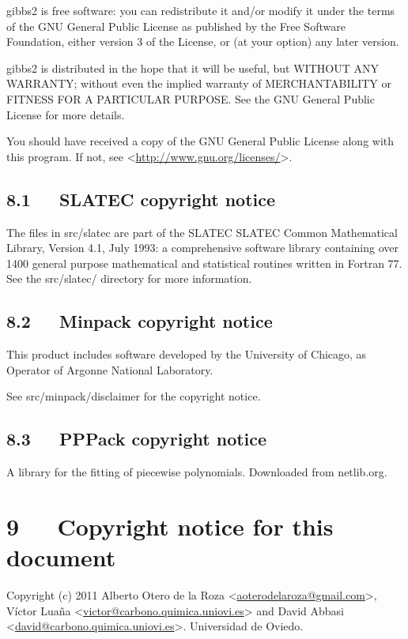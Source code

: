 \documentclass[a4paper]{article}
\begin{document}
gibbs2 is free software: you can redistribute it and/or modify
it under the terms of the GNU General Public License as published by
the Free Software Foundation, either version 3 of the License, or (at
your option) any later version.

gibbs2 is distributed in the hope that it will be useful,
but WITHOUT ANY WARRANTY; without even the implied warranty of
MERCHANTABILITY or FITNESS FOR A PARTICULAR PURPOSE.  See the
GNU General Public License for more details.

You should have received a copy of the GNU General Public License
along with this program.  If not, see <\url{http://www.gnu.org/licenses/}>.


\subsection{8.1   SLATEC copyright notice%
  \label{slatec-copyright-notice}%
}

The files in src/slatec are part of the SLATEC SLATEC Common
Mathematical Library, Version 4.1, July 1993:
a comprehensive software library containing over
1400 general purpose mathematical and statistical routines
written in Fortran 77. See the src/slatec/ directory for more
information.


\subsection{8.2   Minpack copyright notice%
  \label{minpack-copyright-notice}%
}

This product includes software developed by the
University of Chicago, as Operator of Argonne National
Laboratory.

See src/minpack/disclaimer for the copyright notice.


\subsection{8.3   PPPack copyright notice%
  \label{pppack-copyright-notice}%
}

A library for the fitting of piecewise polynomials. Downloaded from
netlib.org.


\section{9   Copyright notice for this document%
  \label{copyright-notice-for-this-document}%
}

Copyright (c) 2011 Alberto Otero de la Roza <\href{mailto:aoterodelaroza@gmail.com}{aoterodelaroza@gmail.com}>,
Víctor Luaña <\href{mailto:victor@carbono.quimica.uniovi.es}{victor@carbono.quimica.uniovi.es}> and David
Abbasi <\href{mailto:david@carbono.quimica.uniovi.es}{david@carbono.quimica.uniovi.es}>. Universidad de Oviedo.
\end{document}
